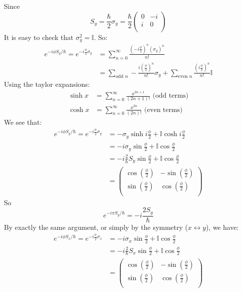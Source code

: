 \documentclass{article}
\numberwithin{equation}{subsection} %
\theoremstyle{definition}
\begin{document}
    Since 
    $$S_y=\frac{\hbar}{2}\sigma_y=\frac{\hbar}{2}
        \left( \begin{array}{cc}
         0 & -i \\
         i & 0 \\
        \end{array} \right)$$
    It is easy to check that $\sigma_y^2 = \mathbb{I}$. So:
    \begin{align*}
        e^{-i\phi S_y/\hbar}=
        e^{-i\frac{\phi}{2}\sigma_y}&=\sum_{n=0}^{\infty}
         \frac{(-i\frac{\phi}{2})^n(\sigma_y)^n}{n!}\nonumber\\
         &=\sum_{\text{odd }n}-\frac{i(\frac{\phi}{2})^n}{n!}\sigma_y
           + \sum_{\text{even }n}\frac{(i\frac{\phi}{2})^n}{n!}\mathbb{I}
    \end{align*}
    Using the taylor expansions:
    \begin{align}
        \sinh{x}&= \sum_{n=0}^{\infty}\frac{x^{2n+1}}{(2n+1)!}
        \text{ (odd terms)}\\
        \cosh{x}&= \sum_{n=0}^{\infty}\frac{x^{2n}}{(2n)!}
        \text{ (even terms)}
    \end{align}
    We see that:
    \begin{align}
        e^{-i\phi S_y/\hbar}=e^{-i\frac{\phi}{2}\sigma_y}&=
         - \sigma_y\sinh{i\frac{\phi}{2}}+ \mathbb{I}\cosh{i\frac{\phi}{2}}
         \nonumber\\
         &=
         -i\sigma_y \sin{\frac{\phi}{2}}+\mathbb{I}\cos{\frac{\phi}{2}}
        \\
         &=-i\frac{2}{\hbar}S_y\sin{\frac{\phi}{2}}
            +\mathbb{I}\cos{\frac{\phi}{2}}
        \\
         &=\left( \begin{array}{cc}
            \cos(\frac{\phi }{2}) & -\sin(\frac{\phi }{2}) \\
            \sin (\frac{\phi }{2}) & \cos (\frac{\phi }{2}) \\
         \end{array}\right)
    \end{align}
    So
    $$e^{-i\pi S_y/\hbar} = -i\frac{2S_y}{\hbar}$$
    By exactly the same argument, or simply by the symmetry
    ($x\leftrightarrow y$), we
    have:
    \begin{align}
        e^{-i\phi S_x/\hbar}=e^{-i\frac{\phi}{2}\sigma_x}&=
         -i\sigma_x \sin{\frac{\phi}{2}}+\mathbb{I}\cos{\frac{\phi}{2}}
        \\
        &=-i\frac{2}{\hbar}S_x\sin{\frac{\phi}{2}}
            +\mathbb{I}\cos{\frac{\phi}{2}}
        \\
        &=\left(\begin{array}{cc}
            \cos(\frac{\phi }{2}) & -\sin(\frac{\phi }{2}) \\
            \sin (\frac{\phi }{2}) & \cos(\frac{\phi }{2}) \\
         \end{array}\right)
    \end{align}
\end{document}

